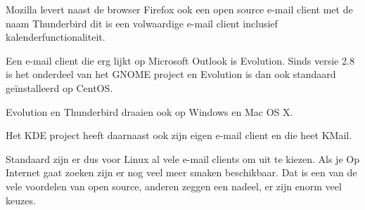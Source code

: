 Mozilla levert naast de browser Firefox ook een open source e-mail client met de naam
Thunderbird dit is een volwaardige e-mail client inclusief kalenderfunctionaliteit.

Een e-mail client die erg lijkt op Microsoft Outlook is Evolution. Sinds versie 2.8 is het onderdeel
van het GNOME project en Evolution is dan ook standaard ge\"installeerd op CentOS.

Evolution en Thunderbird draaien ook op Windows en Mac OS X.

Het KDE project heeft daarnaast ook zijn eigen e-mail client en die heet KMail.

Standaard zijn er dus voor Linux al vele e-mail clients om uit te kiezen. Als je Op Internet gaat zoeken zijn er nog veel meer smaken beschikbaar. Dat is een van de
vele voordelen van open source, anderen zeggen een nadeel, er zijn enorm veel keuzes.
